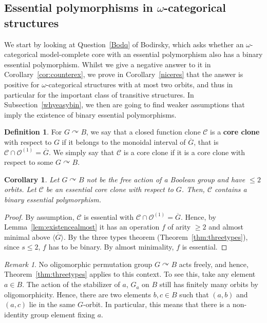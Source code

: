 \documentclass{article}
\newtheorem{corollary}[theorem]{Corollary}
\theoremstyle{remark}
\newtheorem{remark}[theorem]{Remark}
\theoremstyle{definition}
\newtheorem{definition}[theorem]{Definition}
\def\acts{\curvearrowright}
\begin{document}
\subsection{Essential polymorphisms in \texorpdfstring{$\omega$}{omega}-categorical structures}\label{sub:essentialpolys}
We start by looking  at Question~\ref{Bodq} of Bodirsky, which asks whether an $\omega$-categorical model-complete core with an essential polymorphism also has a binary essential polymorphism. Whilst we give a negative answer to it in Corollary~\ref{cor:counterex}, we prove in Corollary~\ref{niceres} that the answer is positive for $\omega$-categorical structures with at most two orbits, and thus in particular for the important class of transitive structures. In   Subsection~\ref{whyeasybin},  we then are going to find weaker assumptions that imply the existence of binary essential polymorphisms. %

\begin{definition}\label{def:coreclone}
   For $G\acts B$, we say that a closed function clone $\mathcal{C}$ is a \textbf{core clone} with respect to $G$ if it belongs to the monoidal interval of $\overline{G}$, that is $\mathcal{C}\cap\mathcal{O}^{(1)}=\overline{G}$. 
 We simply say that $\mathcal{C}$ is a core clone if it is a core clone with respect to some $G\acts B$.
\end{definition}





\begin{corollary}\label{cor:generalcor} Let $G\acts B$ not be the free action of a Boolean group and have $\leq 2$ orbits. Let $\mathcal{C}$ be an essential core clone with respect to $G$. Then,  $\mathcal{C}$ contains a binary essential polymorphism.
\end{corollary}
\begin{proof} By assumption, $\mathcal{C}$ is essential with $\mathcal{C}\cap\mathcal{O}^{(1)}=\overline{G}$. Hence, by Lemma~\ref{lem:existencealmost} it has an operation $f$ of arity $\geq 2$ and almost minimal above $\overline{\langle G\rangle}$. By the three types theorem (Theorem~\ref{thm:threetypes}), since $s\leq 2$, $f$ has to be binary. By almost minimality, $f$ is essential.
\end{proof}


\begin{remark} No oligomorphic permutation group $G\acts B$ %
acts freely, and hence, Theorem~\ref{thm:threetypes} applies to this context. To see this, %
take any  element $a\in B$. The action of the stabilizer of $a$, $G_a$ on $B$ still has finitely many orbits by oligomorphicity. Hence, there are two elements $b,c\in B$ such that $(a,b)$ and $(a,c)$ lie in the same $G$-orbit. In particular, this means that there is a non-identity group element  fixing $a$.
\end{remark}
\end{document}
